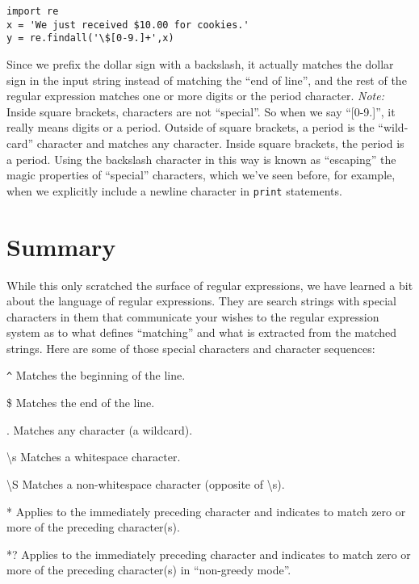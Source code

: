 \beforeverb
\begin{verbatim}
import re
x = 'We just received $10.00 for cookies.'
y = re.findall('\$[0-9.]+',x)
\end{verbatim}
\afterverb
%
Since we prefix the dollar sign with a backslash, it actually matches the dollar sign
in the input string instead of matching the ``end of line'', and the rest of the regular
expression matches one or more digits or the period character.  {\em Note:} Inside
square brackets, characters are not ``special''.   So when we say ``[0-9.]'', it really
means digits or a period.    Outside of square brackets, a period is the ``wild-card''
character and matches any character.  Inside square brackets, the period is a period.
Using the backslash character in this way is known as ``escaping'' the magic
properties of ``special'' characters, which we've seen before, for example, when
we explicitly include a newline character in {\tt print} statements.


\section{Summary}

While this only scratched the surface of regular expressions, we have learned a bit about
the language of regular expressions.  They are search strings with special characters in them
that communicate your wishes to the regular expression system as to what defines ``matching''
and what is extracted from the matched strings.  Here are some of those special characters
and character sequences:

\verb"^" \newline
Matches the beginning of the line.

\$ \newline
Matches the end of the line.

. \newline
Matches any character (a wildcard).

{\textbackslash}s \newline
Matches a whitespace character.

{\textbackslash}S \newline
Matches a non-whitespace character (opposite of {\textbackslash}s).

* \newline
Applies to the immediately preceding character and indicates to match zero or more of the
preceding character(s).

*? \newline
Applies to the immediately preceding character and indicates to match zero or more of the
preceding character(s) in ``non-greedy mode''.

